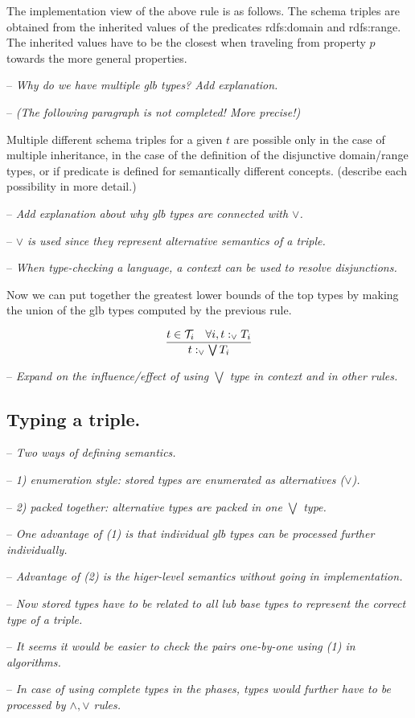 \documentclass[runningheads]{llncs}
\newcommand{\Ti}{{\cal T}_i}
\newcommand{\nl}{\hfill\break}
\newcommand{\notes}[1]{\noindent\begin{small}-- \emph{#1}\\\end{small}}
\begin{document}
The implementation view of the above rule is as follows. The schema
triples are obtained from the inherited values of the predicates
rdfs:domain and rdfs:range. The inherited values have to be the
closest when traveling from property $p$ towards the more general
properties.

\medskip
\notes{Why do we have multiple glb types? Add explanation.}
\notes{(The following paragraph is not completed! More precise!)}

Multiple different schema triples for a given $t$ are possible only in
the case of multiple inheritance, in the case of the definition of the
disjunctive domain/range types, or if predicate is defined for
semantically different concepts. (describe each possibility in more
detail.)


\medskip
\notes{Add explanation about why glb types are connected with $\lor$.}
\notes{$\lor$ is used since they represent alternative semantics of a triple.}
\notes{When type-checking a language, a context can be used to resolve disjunctions.}

Now we can put together the greatest lower bounds of the top types by
making the union of the glb types computed by the previous rule.

\begin{equation}
\dfrac{t\in\Ti\quad \forall\/i, t:_\lor\/T_i}
      {t:_\lor\bigvee\/T_i}
\end{equation}

\medskip
\notes{Expand on the influence/effect of using $\bigvee$ type in context and in other rules.}






\subsection{Typing a triple.}\nl

\notes{Two ways of defining semantics.}
\notes{1) enumeration style: stored types are enumerated as alternatives ($\lor$).}
\notes{2) packed together: alternative types are packed in one $\bigvee$ type.}
\notes{One advantage of (1) is that individual glb types can be processed further individually.}
\notes{Advantage of (2) is the higer-level semantics without going in implementation.}

\notes{Now stored types have to be related to all lub base types to represent the correct type of a triple.}
\notes{It seems it would be easier to check the pairs one-by-one using (1) in algorithms.}
\notes{In case of using complete types in the phases, types would further have to be processed by $\land,\lor$ rules.}
\end{document}
